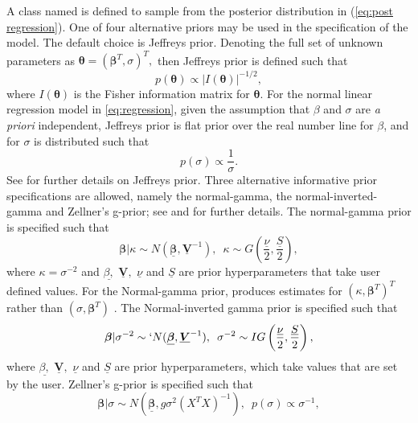 \documentclass[article]{jss}
\begin{document}
A class named  is defined to sample from the
posterior distribution in (\ref{eq:post regression}). One of four
alternative priors may be used in the specification of the model.  The
default choice is Jeffreys prior. Denoting the full set of unknown
parameters as $\bm{\theta}=(\bm{\beta}^{T},\sigma)^{T},$ then
Jeffreys prior is defined such that \begin{equation}
  p(\bm{\theta})\propto|I(\bm{\theta})|^{-1/2},\label{eq:Jeffrey's
    Prior}
\end{equation} where $I(\bm{\theta})$ is the Fisher
	information matrix for $\bm{\theta}.$ For the normal linear
	regression model in \ref{eq:regression}, given the assumption that $\beta$
	and $\sigma$ are \emph{a priori} independent, Jeffreys prior is flat prior over the 
	real number line for $\beta$, and for $\sigma$ is distributed such that 
\begin{equation}
		p\left(\sigma\right)\propto\frac{1}{\sigma}.
\end{equation}
		See \cite{Zellner1971} for further details on Jeffreys prior. Three alternative informative
prior specifications are allowed, namely the normal-gamma, the
normal-inverted-gamma and Zellner's g-prior; see \cite{Zellner1971} and \cite{MarinRobert2007}
for further details.  The normal-gamma prior is
specified such that\begin{equation} 
\bm{\beta}|\kappa\sim
  N(\bm{\underline{\beta}},\underline{\bm{V}}^{-1}),\,\,\,\kappa\sim
  G\left(\frac{\underline{\nu}}{2},\frac{\underline{S}}{2}\right),\label{eq:Normal
    Gamma}\end{equation} 
where $\kappa=\sigma^{-2}$ and
$\underline{\beta,}$ $\underline{\bm{V}},$ $\underline{\nu}$ and
$\underline{S}$ are prior hyperparameters that take user defined
values. For the Normal-gamma prior,  produces
estimates for\emph{ $\left(\kappa,\bm{\beta}^{T}\right)^{T}$ }rather
than $\left(\sigma,\bm{\beta}^{T}\right)$ . The Normal-inverted gamma
prior is specified such that
\begin{equation}
  \bm{\beta}|\sigma^{-2}\sim`
  N(\bm{\underline{\beta}},\underline{\bm{V}}^{-1}),\,\,\,\sigma^{-2}\sim
  IG\left(\frac{\underline{\nu}}{2},\frac{\underline{S}}{2}\right),\label{eq:Normal
    Inverted Gamma}
\end{equation} 
where $\underline{\beta,}$
$\underline{\bm{V}},$ $\underline{\nu}$ and $\underline{S}$ are prior
hyperparameters, which take values that are set by the user. Zellner's
g-prior is specified such that
\begin{equation} \bm{\beta}|\sigma\sim
  N\left(\underline{\bm{\beta}},g\sigma^{2}\left(X^{T}X\right)^{-1}\right),\,\,\,
  p(\sigma)\propto\sigma^{-1},\label{eq:g-prior}
\end{equation}
\end{document}
